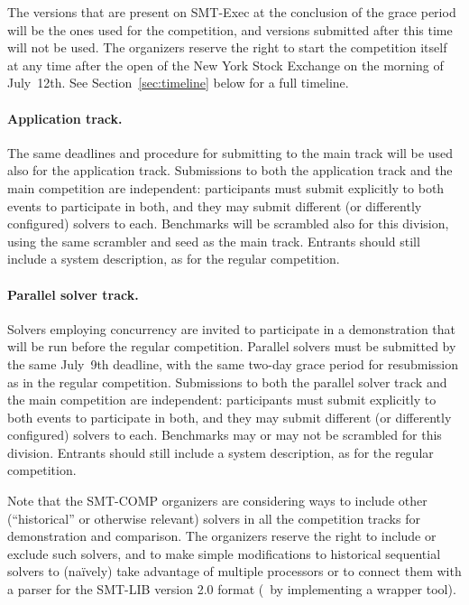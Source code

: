 \documentclass[12pt]{article}
\begin{document}
The versions that are present on SMT-Exec at the conclusion of the
grace period will be the ones used for the competition, and versions
submitted after this time will not be used.  The organizers reserve
the right to start the competition itself at any time after the open
of the New York Stock Exchange on the morning of July~12th.  See
Section~\ref{sec:timeline} below for a full timeline.

\paragraph{Application track.} %
The same deadlines and procedure for submitting to the main track will be used
also for the application track. Submissions to both the application track and
the main competition are independent: participants must submit explicitly to
both events to participate in both, and they may submit different (or
differently configured) solvers to each.  Benchmarks will be scrambled also
for this division, using the same scrambler and seed as the main track.
Entrants should still include a system description, as for the regular
competition.

\paragraph{Parallel solver track.} %
Solvers employing concurrency are invited to participate in a
demonstration that will be run before the regular competition.
Parallel solvers must be submitted by the same July~9th deadline,
with the same two-day grace period for resubmission as in the regular
competition.  Submissions to both the parallel solver track
and the main competition are independent: participants must submit
explicitly to both events to participate in both, and they may submit
different (or differently configured) solvers to each.  Benchmarks may
or may not be scrambled for this division.  Entrants should still
include a system description, as for the regular competition.

\medskip
\noindent
Note that the SMT-COMP organizers are considering ways to include
other (``historical'' or otherwise relevant) solvers in all the competition tracks for
demonstration and comparison.  The organizers reserve the right to
include or exclude such solvers, and to make simple modifications
to historical sequential solvers to (na\"ively) take advantage of
multiple processors 
or to connect them with a parser for the SMT-LIB version 2.0 format
(\eg\ by implementing a wrapper tool).
\end{document}
